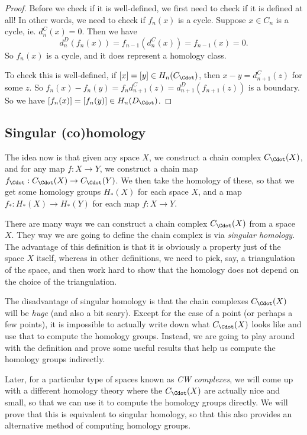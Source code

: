 \documentclass[a4paper]{article}
\theoremstyle{definition}
\begin{document}
\begin{proof}
  Before we check if it is well-defined, we first need to check if it is defined at all! In other words, we need to check if $f_n(x)$ is a cycle. Suppose $x \in C_n$ is a cycle, ie. $d_n^C(x) = 0$. Then we have
  \[
    d_n^D(f_n(x)) = f_{n - 1}(d_n^C(x)) = f_{n - 1}(x) = 0.
  \]
  So $f_n(x)$ is a cycle, and it does represent a homology class.

  To check this is well-defined, if $[x] = [y] \in H_n(C_{\Cdot})$, then $x - y = d_{n + 1}^C(z)$ for some $z$. So $f_n(x) - f_n(y) = f_n d_{n + 1}^C(z) = d_{n + 1}^D (f_{n + 1}(z))$ is a boundary. So we have $[f_n(x)] = [f_n(y)] \in H_n(D_{\Cdot})$.
\end{proof}

\subsection{Singular (co)homology}
The idea now is that given any space $X$, we construct a chain complex $C_\Cdot(X)$, and for any map $f: X \to Y$, we construct a chain map $f_\Cdot: C_\Cdot(X) \to C_\Cdot(Y)$. We then take the homology of these, so that we get some homology groups $H_*(X)$ for each space $X$, and a map $f_*: H_*(X) \to H_*(Y)$ for each map $f: X \to Y$.

There are many ways we can construct a chain complex $C_\Cdot(X)$ from a space $X$. They way we are going to define the chain complex is via \emph{singular homology}. The advantage of this definition is that it is obviously a property just of the space $X$ itself, whereas in other definitions, we need to pick, say, a triangulation of the space, and then work hard to show that the homology does not depend on the choice of the triangulation.

The disadvantage of singular homology is that the chain complexes $C_\Cdot(X)$ will be \emph{huge} (and also a bit scary). Except for the case of a point (or perhaps a few points), it is impossible to actually write down what $C_\Cdot(X)$ looks like and use that to compute the homology groups. Instead, we are going to play around with the definition and prove some useful results that help us compute the homology groups indirectly.

Later, for a particular type of spaces known as \emph{CW complexes}, we will come up with a different homology theory where the $C_{\Cdot}(X)$ are actually nice and small, so that we can use it to compute the homology groups directly. We will prove that this is equivalent to singular homology, so that this also provides an alternative method of computing homology groups.
\end{document}
